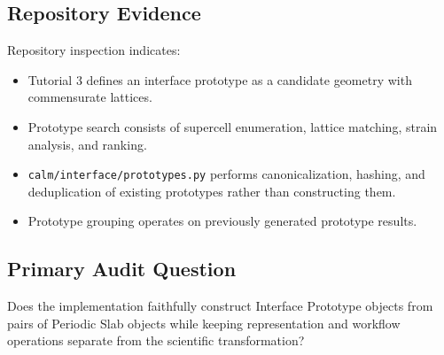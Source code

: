 \subsection{Repository Evidence}

Repository inspection indicates:

\begin{itemize}
\item Tutorial 3 defines an interface prototype as a candidate geometry with
commensurate lattices.
\item Prototype search consists of supercell enumeration, lattice matching,
strain analysis, and ranking.
\item \texttt{calm/interface/prototypes.py} performs canonicalization,
hashing, and deduplication of existing prototypes rather than constructing
them.
\item Prototype grouping operates on previously generated prototype results.
\end{itemize}

\subsection{Primary Audit Question}

Does the implementation faithfully construct Interface Prototype objects from
pairs of Periodic Slab objects while keeping representation and workflow
operations separate from the scientific transformation?
